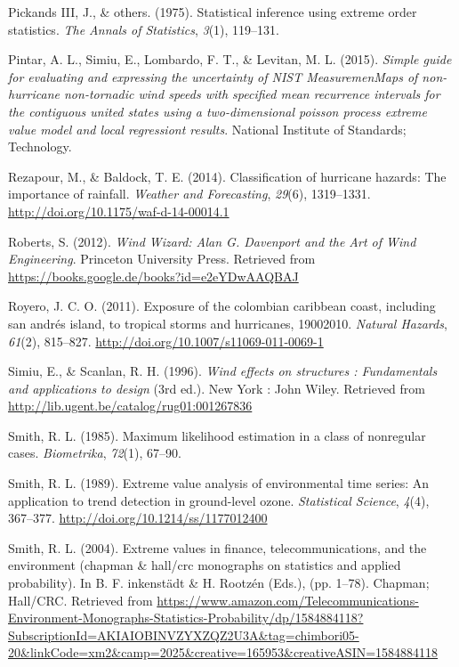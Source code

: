 \documentclass[12pt,oneside]{reedthesis}
\begin{document}
\leavevmode\hypertarget{ref-PickandsIII1975}{}%
Pickands III, J., \& others. (1975). Statistical inference using extreme order statistics. \emph{The Annals of Statistics}, \emph{3}(1), 119--131.

\leavevmode\hypertarget{ref-Pintar2015}{}%
Pintar, A. L., Simiu, E., Lombardo, F. T., \& Levitan, M. L. (2015). \emph{Simple guide for evaluating and expressing the uncertainty of NIST MeasuremenMaps of non-hurricane non-tornadic wind speeds with specified mean recurrence intervals for the contiguous united states using a two-dimensional poisson process extreme value model and local regressiont results}. National Institute of Standards; Technology.

\leavevmode\hypertarget{ref-Rezapour2014}{}%
Rezapour, M., \& Baldock, T. E. (2014). Classification of hurricane hazards: The importance of rainfall. \emph{Weather and Forecasting}, \emph{29}(6), 1319--1331. \url{http://doi.org/10.1175/waf-d-14-00014.1}

\leavevmode\hypertarget{ref-Roberts2012}{}%
Roberts, S. (2012). \emph{Wind Wizard: Alan G. Davenport and the Art of Wind Engineering}. Princeton University Press. Retrieved from \url{https://books.google.de/books?id=e2eYDwAAQBAJ}

\leavevmode\hypertarget{ref-Royero2011}{}%
Royero, J. C. O. (2011). Exposure of the colombian caribbean coast, including san andrés island, to tropical storms and hurricanes, 19002010. \emph{Natural Hazards}, \emph{61}(2), 815--827. \url{http://doi.org/10.1007/s11069-011-0069-1}

\leavevmode\hypertarget{ref-Simiu1996}{}%
Simiu, E., \& Scanlan, R. H. (1996). \emph{Wind effects on structures : Fundamentals and applications to design} (3rd ed.). New York : John Wiley. Retrieved from \url{http://lib.ugent.be/catalog/rug01:001267836}

\leavevmode\hypertarget{ref-Smith1985}{}%
Smith, R. L. (1985). Maximum likelihood estimation in a class of nonregular cases. \emph{Biometrika}, \emph{72}(1), 67--90.

\leavevmode\hypertarget{ref-Smith1989}{}%
Smith, R. L. (1989). Extreme value analysis of environmental time series: An application to trend detection in ground-level ozone. \emph{Statistical Science}, \emph{4}(4), 367--377. \url{http://doi.org/10.1214/ss/1177012400}

\leavevmode\hypertarget{ref-Smith2004}{}%
Smith, R. L. (2004). Extreme values in finance, telecommunications, and the environment (chapman \& hall/crc monographs on statistics and applied probability). In B. F. inkenstädt \& H. Rootzén (Eds.), (pp. 1--78). Chapman; Hall/CRC. Retrieved from \url{https://www.amazon.com/Telecommunications-Environment-Monographs-Statistics-Probability/dp/1584884118?SubscriptionId=AKIAIOBINVZYXZQZ2U3A\&tag=chimbori05-20\&linkCode=xm2\&camp=2025\&creative=165953\&creativeASIN=1584884118}
\end{document}
